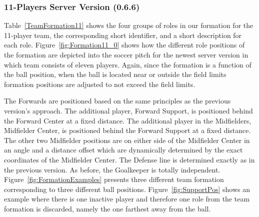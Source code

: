 \subsubsection*{11-Players Server Version (0.6.6)} 

Table~\ref{TeamFormation11} shows the four groups of roles in our formation for the 11-player team, the corresponding short identifier, and a short description for each role.
Figure~\ref{fig:Formation11_0} shows how the different role positions of the formation are depicted into the soccer pitch for the newest server version in which team consists of eleven players. Again, since the formation is a function of the ball position, when the ball is located near or outside the field limits formation positions are adjusted to not exceed the field limits.

The Forwards are positioned based on the same principles as the previous version's approach. The additional player, Forward Support, is positioned behind the Forward Center at a fixed distance. The additional player in the Midfielders, Midfielder Center, is positioned behind  the Forward Support at a fixed distance. The other two Midfielder positions are on either side of the Midfielder Center in an angle and a distance offset which are dynamically determined by the exact coordinates of the Midfielder Center. The Defense line is determined exactly as in the previous version. As before, the Goalkeeper is totally independent. Figure~\ref{fig:FormationExamples} presents three different team formation corresponding to three different ball positions. Figure~\ref{fig:SupportPos} shows an example where there is one inactive player and therefore one role from the team formation is discarded, namely the one farthest away from the ball. 














